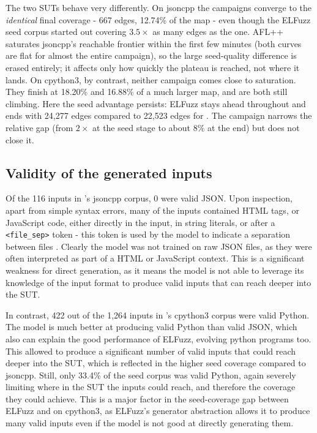 The two SUTs behave very differently. On jsoncpp the campaigns converge to the \textit{identical} final coverage - 667 edges, 12.74\% of the map - even though the ELFuzz seed corpus started out covering $3.5\times$ as many edges as the \toolname{} one. AFL++ saturates jsoncpp's reachable frontier within the first few minutes (both curves are flat for almost the entire campaign), so the large seed-quality difference is erased entirely; it affects only how quickly the plateau is reached, not where it lands. On cpython3, by contrast, neither campaign comes close to saturation. They finish at 18.20\% and 16.88\% of a much larger map, and are both still climbing. Here the seed advantage persists: ELFuzz stays ahead throughout and ends with 24{,}277 edges compared to 22,523 edges for \toolname{}. The campaign narrows the relative gap (from $2\times$ at the seed stage to about $8\%$ at the end) but does not close it.

\subsection{Validity of the generated inputs}
\label{sec:eval-validity}

Of the 116 inputs in \toolname{}'s jsoncpp corpus, 0 were valid JSON. Upon inspection, apart from simple syntax errors, many of the inputs contained HTML tags, or JavaScript code, either directly in the input, in string literals, or after a \texttt{<file\_sep>} token - this token is used by the model to indicate a separation between files \cite{hui_2024_qwen25coder}. Clearly the model was not trained on raw JSON files, as they were often interpreted as part of a HTML or JavaScript context. This is a significant weakness for direct generation, as it means the model is not able to leverage its knowledge of the input format to produce valid inputs that can reach deeper into the SUT.

In contrast, 422 out of the 1,264 inputs in \toolname{}'s cpython3 corpus were valid Python. The model is much better at producing valid Python than valid JSON, which also can explain the good performance of ELFuzz, evolving python programs too. This allowed \toolname{} to produce a significant number of valid inputs that could reach deeper into the SUT, which is reflected in the higher seed coverage compared to jsoncpp. Still, only 33.4\% of the seed corpus was valid Python, again severely limiting where in the SUT the inputs could reach, and therefore the coverage they could achieve. This is a major factor in the seed-coverage gap between ELFuzz and \toolname{} on cpython3, as ELFuzz's generator abstraction allows it to produce many valid inputs even if the model is not good at directly generating them.

